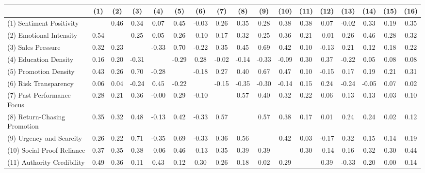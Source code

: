 \begin{landscape}
\begin{table}[!ht]
    \setlength{\tabcolsep}{5pt}
    \begin{tabular}{lcccccccccccccccc}
      \toprule
                                      & (1)   & (2)  & (3)   & (4)   & (5)   & (6)   & (7)   & (8)   & (9)   & (10)  & (11)  & (12)  & (13)  & (14)  & (15)  & (16)  \\ \midrule
      (1) Sentiment Positivity        &       & 0.46 & 0.34  & 0.07  & 0.45  & -0.03 & 0.26  & 0.35  & 0.28  & 0.38  & 0.38  & 0.07  & -0.02 & 0.33  & 0.19  & 0.35  \\
      (2) Emotional Intensity         & 0.54  &      & 0.25  & 0.05  & 0.26  & -0.10 & 0.17  & 0.32  & 0.25  & 0.36  & 0.21  & -0.01 & 0.26  & 0.46  & 0.28  & 0.32  \\
      (3) Sales Pressure              & 0.32  & 0.23 &       & -0.33 & 0.70  & -0.22 & 0.35  & 0.45  & 0.69  & 0.42  & 0.10  & -0.13 & 0.21  & 0.12  & 0.18  & 0.22  \\
      (4) Education Density           & 0.16  & 0.20 & -0.31 &       & -0.29 & 0.28  & -0.02 & -0.14 & -0.33 & -0.09 & 0.30  & 0.37  & -0.22 & 0.05  & 0.08  & 0.08  \\
      (5) Promotion Density           & 0.43  & 0.26 & 0.70  & -0.28 &       & -0.18 & 0.27  & 0.40  & 0.67  & 0.47  & 0.10  & -0.15 & 0.17  & 0.19  & 0.21  & 0.31  \\
      (6) Risk Transparency           & 0.06  & 0.04 & -0.24 & 0.45  & -0.22 &       & -0.15 & -0.35 & -0.30 & -0.14 & 0.15  & 0.24  & -0.24 & -0.05 & 0.07  & 0.02  \\
      (7) Past Performance Focus      & 0.28  & 0.21 & 0.36  & -0.00 & 0.29  & -0.10 &       & 0.57  & 0.40  & 0.32  & 0.22  & 0.06  & 0.13  & 0.13  & 0.03  & 0.10  \\
      (8) Return-Chasing Promotion    & 0.35  & 0.32 & 0.48  & -0.13 & 0.42  & -0.33 & 0.57  &       & 0.57  & 0.38  & 0.17  & 0.01  & 0.24  & 0.24  & 0.02  & 0.12  \\
      (9) Urgency and Scarcity        & 0.26  & 0.22 & 0.71  & -0.35 & 0.69  & -0.33 & 0.36  & 0.56  &       & 0.42  & 0.03  & -0.17 & 0.32  & 0.15  & 0.14  & 0.19  \\
      (10) Social Proof Reliance      & 0.37  & 0.35 & 0.38  & -0.06 & 0.46  & -0.13 & 0.35  & 0.39  & 0.39  &       & 0.30  & -0.14 & 0.16  & 0.32  & 0.30  & 0.44  \\
      (11) Authority Credibility      & 0.49  & 0.36 & 0.11  & 0.43  & 0.12  & 0.30  & 0.26  & 0.18  & 0.02  & 0.29  &       & 0.39  & -0.33 & 0.20  & 0.00  & 0.14  \\

\end{tabular}
\end{table}
\end{landscape}
